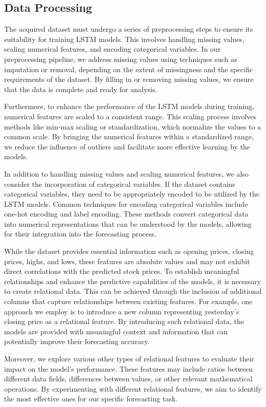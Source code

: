 \documentclass[conference]{IEEEtran}
\begin{document}
\subsection{Data Processing}\label{AA}
The acquired dataset must undergo a series of preprocessing steps to ensure its suitability for training LSTM models. This involves handling missing values, scaling numerical features, and encoding categorical variables. In our preprocessing pipeline, we address missing values using techniques such as imputation or removal, depending on the extent of missingness and the specific requirements of the dataset. By filling in or removing missing values, we ensure that the data is complete and ready for analysis.

Furthermore, to enhance the performance of the LSTM models during training, numerical features are scaled to a consistent range. This scaling process involves methods like min-max scaling or standardization, which normalize the values to a common scale. By bringing the numerical features within a standardized range, we reduce the influence of outliers and facilitate more effective learning by the models.

In addition to handling missing values and scaling numerical features, we also consider the incorporation of categorical variables. If the dataset contains categorical variables, they need to be appropriately encoded to be utilized by the LSTM models. Common techniques for encoding categorical variables include one-hot encoding and label encoding. These methods convert categorical data into numerical representations that can be understood by the models, allowing for their integration into the forecasting process.

While the dataset provides essential information such as opening prices, closing prices, highs, and lows, these features are absolute values and may not exhibit direct correlations with the predicted stock prices. To establish meaningful relationships and enhance the predictive capabilities of the models, it is necessary to create relational data. This can be achieved through the inclusion of additional columns that capture relationships between existing features. For example, one approach we employ is to introduce a new column representing yesterday's closing price as a relational feature. By introducing such relational data, the models are provided with meaningful context and information that can potentially improve their forecasting accuracy.

Moreover, we explore various other types of relational features to evaluate their impact on the model's performance. These features may include ratios between different data fields, differences between values, or other relevant mathematical operations. By experimenting with different relational features, we aim to identify the most effective ones for our specific forecasting task.
\end{document}
